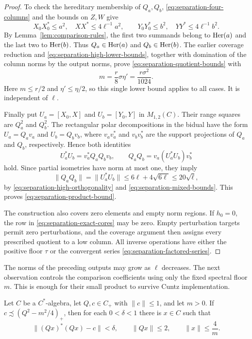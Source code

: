 \begin{proof}
To check the hereditary membership of $Q_a,Q_b$,
\eqref{eq:separation-four-columns} and the bounds on $Z,W$ give
\[
 X_0X_0^*\le a^2,\quad XX^*\le4\ell^{-1}a^2,\qquad
 Y_0Y_0^*\le b^2,\quad YY^*\le4\ell^{-1}b^2.
\]
By Lemma~\ref{lem:comparison-rules}, the first two summands belong
to $\operatorname{Her}(a)$ and the last two to $\operatorname{Her}(b)$.
Thus $Q_a\in\operatorname{Her}(a)$ and $Q_b\in\operatorname{Her}(b)$.
The earlier coverage reduction and
\eqref{eq:separation-high-lower-bounds}, together with domination of
the column norms by the output norms, prove
\eqref{eq:separation-quotient-bounds} with
\[
 m=\frac r8\sigma\eta'=\frac{r\sigma^2}{1024}.
\]
Here $m\le r/2$ and $\eta'\le\eta/2$, so this single lower bound
applies to all cases.  It is independent of $\ell$.

Finally put $U_a=[X_0,X]$ and $U_b=[Y_0,Y]$ in $M_{1,2}(C)$.
Their range squares are $Q_a^2$ and $Q_b^2$.
The rectangular polar decompositions in the bidual have the form
$U_a=Q_av_a$ and $U_b=Q_bv_b$, where
$v_av_a^*$ and $v_bv_b^*$ are the support projections of $Q_a$
and $Q_b$, respectively.  Hence both identities
\[
 U_a^*U_b=v_a^*Q_aQ_bv_b,\qquad
 Q_aQ_b=v_a(U_a^*U_b)v_b^*
\]
hold.  Since partial isometries have norm at most one, they imply
\[
 \|Q_aQ_b\|=\|U_a^*U_b\|
 \le6\ell+4\sqrt{6\ell}\le20\sqrt\ell,
\]
by \eqref{eq:separation-high-orthogonality} and
\eqref{eq:separation-mixed-bounds}.
This proves \eqref{eq:separation-product-bound}.

The construction also covers zero elements and empty norm regions.
If $h_0=0$, the row in \eqref{eq:separation-exact-cores} may be zero.
Empty perturbation targets permit zero perturbations, and the coverage
argument then assigns every prescribed quotient to a low column.
All inverse operations have either the positive floor $\tau$ or the
convergent series \eqref{eq:separation-factored-series}.
\end{proof}

The norms of the preceding outputs may grow as $\ell$ decreases.
The next observation controls the comparison coefficients using only
the fixed spectral floor $m$.  This is enough for their small product
to survive Cuntz implementation.

\begin{lemma}
\label{lem:bounded-implementation}
Let $C$ be a $C^*$-algebra, let $Q,c\in C_+$ with $\|c\|\le1$,
and let $m>0$.  If
$c\precsim(Q^2-m^2/4)_+$, then for each $0<\delta<1$ there is
$x\in C$ such that
\begin{equation}\label{eq:separation-bounded-implementation}
 \|(Qx)^*(Qx)-c\|<\delta,\qquad
 \|Qx\|\le2,\qquad \|x\|\le\frac4m.
\end{equation}
\end{lemma}

